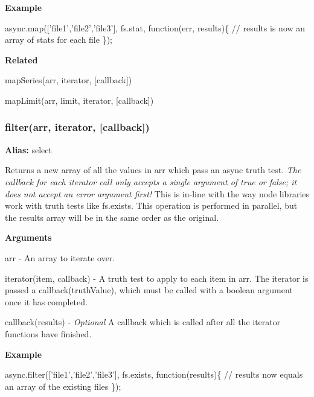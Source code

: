 {\bfseries Example}


\begin{DoxyCode}
async.map(['file1','file2','file3'], fs.stat, function(err, results)\{
    // results is now an array of stats for each file
\});
\end{DoxyCode}


{\bfseries Related}
\begin{DoxyItemize}
\item map\+Series(arr, iterator, \mbox{[}callback\mbox{]})
\item map\+Limit(arr, limit, iterator, \mbox{[}callback\mbox{]}) 


\end{DoxyItemize}

\label{_select}%
 \label{_filter}%
 \subsubsection*{filter(arr, iterator, \mbox{[}callback\mbox{]})}

{\bfseries Alias\+:} {\ttfamily select}

Returns a new array of all the values in {\ttfamily arr} which pass an async truth test. {\itshape The callback for each {\ttfamily iterator} call only accepts a single argument of {\ttfamily true} or {\ttfamily false}; it does not accept an error argument first!} This is in-\/line with the way node libraries work with truth tests like {\ttfamily fs.\+exists}. This operation is performed in parallel, but the results array will be in the same order as the original.

{\bfseries Arguments}


\begin{DoxyItemize}
\item {\ttfamily arr} -\/ An array to iterate over.
\item {\ttfamily iterator(item, callback)} -\/ A truth test to apply to each item in {\ttfamily arr}. The {\ttfamily iterator} is passed a {\ttfamily callback(truth\+Value)}, which must be called with a boolean argument once it has completed.
\item {\ttfamily callback(results)} -\/ {\itshape Optional} A callback which is called after all the {\ttfamily iterator} functions have finished.
\end{DoxyItemize}

{\bfseries Example}


\begin{DoxyCode}
async.filter(['file1','file2','file3'], fs.exists, function(results)\{
    // results now equals an array of the existing files
\});
\end{DoxyCode}


